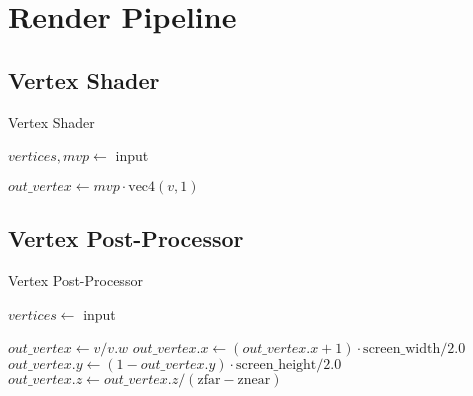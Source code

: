 \section{Render Pipeline}
\subsection{Vertex Shader}
\begin{algorithm}[H]
\caption{Vertex Shader}
\begin{algorithmic}
\State $vertices, mvp \gets$ input  

    \State $out\_vertex \gets mvp \cdot \text{vec4}(v, 1)$
\end{algorithmic}
\end{algorithm}

\subsection{Vertex Post-Processor}
\begin{algorithm}[H]
\caption{Vertex Post-Processor}
\begin{algorithmic}
\State $vertices \gets$ input

    \State $out\_vertex \gets v / v.w$
    \State $out\_vertex.x \gets (out\_vertex.x + 1) \cdot \text{screen\_width} / 2.0$
    \State $out\_vertex.y \gets (1 - out\_vertex.y) \cdot \text{screen\_height} / 2.0$
    \State $out\_vertex.z \gets out\_vertex.z / (\text{zfar} - \text{znear})$
\end{algorithmic}
\end{algorithm}

